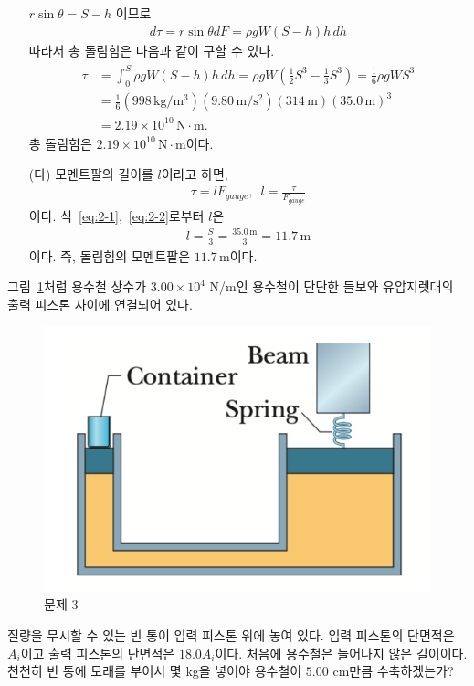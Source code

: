 \documentclass[floatfix,nofootinbib,superscriptaddress,fleqn]{revtex4-2}
\begin{document}
\begin{itemize}
  $r\sin\theta=S-h$ 이므로 
  \begin{align}
    d\tau = r\sin\theta dF
    =\rho g W (S-h)h \,dh
  \end{align}
  따라서 총 돌림힘은 다음과 같이 구할 수 있다.
  \begin{align}
    \begin{split}\label{eq:2-2}
      \tau &=\int_0^S \rho g W (S-h)h \,dh 
      = \rho g W\left(\frac{1}{2}S^3-\frac{1}{3}S^3\right)
      =\frac{1}{6}\rho g WS^3 \\
      &=\frac{1}{6}(998\,\mathrm{kg/m^3})
      (9.80\,\mathrm{m/s^2}) 
      (314\,\mathrm{m})(35.0\,\mathrm{m})^3  \\
      &= 2.19\times 10^{10}\,\mathrm{N\cdot m}.
    \end{split}
  \end{align}
  총 돌림힘은 $2.19\times 10^{10}\,\mathrm{N\cdot m}$이다.
  \item[(다)] 모멘트팔의 길이를 $l$이라고 하면,
  \begin{align}
    \tau = lF_{gauge},\,\,\,l = \frac{\tau}{F_{gauge}}
  \end{align}
  이다. 식~\eqref{eq:2-1},~\eqref{eq:2-2}로부터 $l$은
  \begin{align}
    l = \frac{S}{3} = \frac{35.0\,\mathrm{m}}{3}
    =11.7\,\mathrm{m}
  \end{align}
  이다. 즉, 돌림힘의 모멘트팔은 $11.7\,\mathrm{m}$이다.
\end{itemize}

\vspace{1.cm}


그림~\ref{fig:2}처럼 용수철 상수가 $3.00\times 10^4$ N/m인 용수철이
단단한 들보와 유압지렛대의 출력 피스톤 사이에 연결되어 있다.
\begin{figure}[htp]
  \centering
  \includegraphics[scale=0.65]{Qfig16-2.pdf}
    \caption{문제 3}
  \label{fig:2}
\end{figure}
 질량을 무시할 수 있는 빈 통이 입력 피스톤 위에 놓여 있다. 입력 피스톤의
단면적은 $A_i$이고 출력 피스톤의 단면적은 $18.0 A_i$이다. 처음에
용수철은 늘어나지 않은 길이이다. 천천히 빈 통에 모래를 부어서 몇 kg을
넣어야 용수철이 $5.00$ cm만큼 수축하겠는가? 
\end{document}
